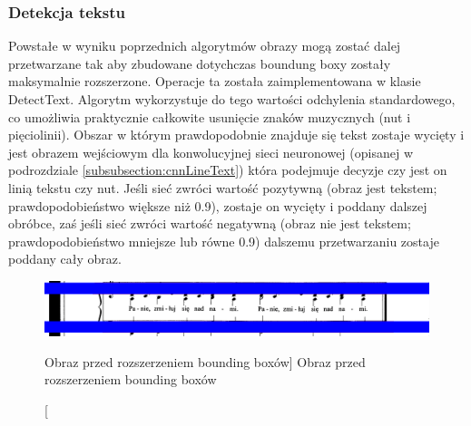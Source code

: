 \documentclass[a4paper,12pt]{article}
\newcommand\spacingIndent{2.2em}
\begin{document}
		
		\subsubsection{Detekcja tekstu} 		
			\hspace{\spacingIndent}  
			Powstałe w wyniku poprzednich algorytmów obrazy mogą zostać dalej przetwarzane tak aby zbudowane dotychczas boundung boxy zostały maksymalnie rozszerzone. Operacje ta została zaimplementowana w klasie DetectText. 
			Algorytm wykorzystuje do tego wartości odchylenia standardowego, co       umożliwia praktycznie całkowite usunięcie znaków muzycznych (nut i        pięciolinii). Obszar w którym prawdopodobnie znajduje się tekst
			zostaje     wycięty i jest obrazem wejściowym dla konwolucyjnej sieci neuronowej (opisanej w podrozdziale \ref{subsubsection:cnnLineText})       która podejmuje decyzje czy jest on linią tekstu czy nut. Jeśli sieć        zwróci wartość pozytywną (obraz jest tekstem; prawdopodobieństwo większe     niż 0.9), zostaje on wycięty i poddany dalszej obróbce, zaś jeśli sieć       zwróci wartość negatywną (obraz nie jest tekstem; prawdopodobieństwo        mniejsze lub równe 0.9) dalszemu przetwarzaniu zostaje poddany cały         obraz.  

			    \begin{figure}[!ht]  
			        \begin{center}
				        \includegraphics[width=16.5cm, frame] {image//exampleImage//005_a.png} 
			        \end{center}
			        \caption
    			        [Obraz przed rozszerzeniem bounding boxów]  
    			        {Obraz przed rozszerzeniem bounding boxów} 
		        \end{figure} 
		
\end{document}
